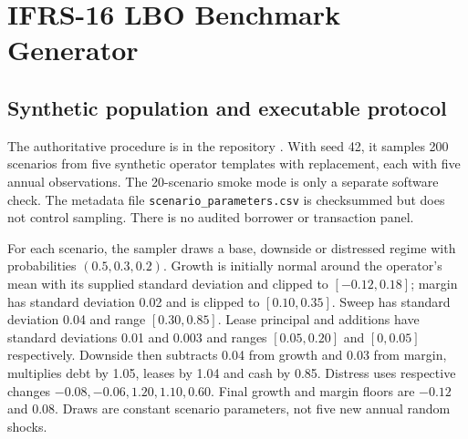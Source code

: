 \documentclass[11pt,a4paper]{article}
\theoremstyle{plain}
\theoremstyle{definition}
\begin{document}
\section{IFRS-16 LBO Benchmark Generator}
\subsection{Synthetic population and executable protocol}
The authoritative procedure is  in the
repository \citep{repository}. With seed 42,
it samples 200 scenarios from five synthetic operator templates with replacement,
each with five annual observations. The 20-scenario smoke mode is only a separate
software check. The metadata file \texttt{scenario\_parameters.csv} is checksummed
but does not control sampling. There is no audited borrower or transaction panel.

For each scenario, the sampler draws a base, downside or distressed regime with
probabilities $(0.5,0.3,0.2)$. Growth is initially normal around the operator's mean
with its supplied standard deviation and clipped to $[-0.12,0.18]$; margin has
standard deviation 0.02 and is clipped to $[0.10,0.35]$. Sweep has standard
deviation 0.04 and range $[0.30,0.85]$. Lease principal and additions have standard
deviations 0.01 and 0.003 and ranges $[0.05,0.20]$ and $[0,0.05]$ respectively.
Downside then subtracts 0.04 from growth and 0.03 from margin, multiplies debt by
1.05, leases by 1.04 and cash by 0.85. Distress uses respective changes
$-0.08,-0.06,1.20,1.10,0.60$. Final growth and margin floors are $-0.12$ and 0.08.
Draws are constant scenario parameters, not five new annual random shocks.
\end{document}
